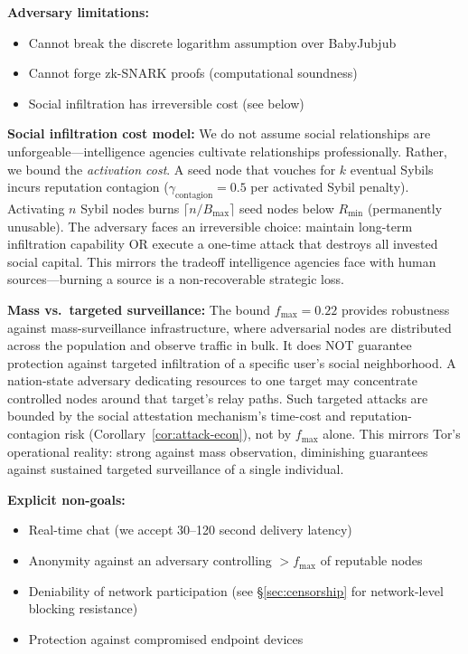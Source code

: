 \documentclass[11pt,a4paper]{article}
\begin{document}
\textbf{Adversary limitations:}
\begin{itemize}[nosep]
    \item Cannot break the discrete logarithm assumption over BabyJubjub
    \item Cannot forge zk-SNARK proofs (computational soundness)
    \item Social infiltration has irreversible cost (see below)
\end{itemize}

\textbf{Social infiltration cost model:} We do not assume social relationships are unforgeable---intelligence agencies cultivate relationships professionally. Rather, we bound the \emph{activation cost}. A seed node that vouches for $k$ eventual Sybils incurs reputation contagion ($\gamma_{\text{contagion}} = 0.5$ per activated Sybil penalty). Activating $n$ Sybil nodes burns $\lceil n / B_{\max} \rceil$ seed nodes below $R_{\min}$ (permanently unusable). The adversary faces an irreversible choice: maintain long-term infiltration capability OR execute a one-time attack that destroys all invested social capital. This mirrors the tradeoff intelligence agencies face with human sources---burning a source is a non-recoverable strategic loss.

\textbf{Mass vs.\ targeted surveillance:} The bound $f_{\max} = 0.22$ provides robustness against mass-surveillance infrastructure, where adversarial nodes are distributed across the population and observe traffic in bulk. It does NOT guarantee protection against targeted infiltration of a specific user's social neighborhood. A nation-state adversary dedicating resources to one target may concentrate controlled nodes around that target's relay paths. Such targeted attacks are bounded by the social attestation mechanism's time-cost and reputation-contagion risk (Corollary~\ref{cor:attack-econ}), not by $f_{\max}$ alone. This mirrors Tor's operational reality: strong against mass observation, diminishing guarantees against sustained targeted surveillance of a single individual.

\textbf{Explicit non-goals:}
\begin{itemize}[nosep]
    \item Real-time chat (we accept 30--120 second delivery latency)
    \item Anonymity against an adversary controlling $> f_{\max}$ of reputable nodes
    \item Deniability of network participation (see \S\ref{sec:censorship} for network-level blocking resistance)
    \item Protection against compromised endpoint devices
\end{itemize}
\end{document}
